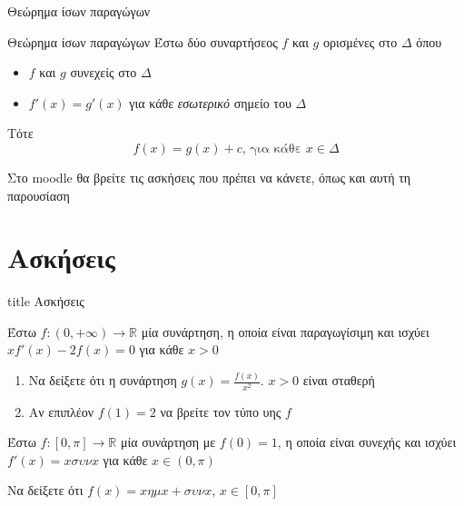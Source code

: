 \documentclass{presentation}
\begin{document}
\begin{frame}{Θεώρημα ίσων παραγώγων}
    \begin{block}{Θεώρημα ίσων παραγώγων}
        Έστω δύο συναρτήσεος $f$ και $g$ ορισμένες στο $Δ$ όπου
        \begin{itemize}
            \item $f$ και $g$ συνεχείς στο $Δ$
            \item $f'(x)=g'(x)$ για κάθε \emph{εσωτερικό} σημείο του $Δ$
        \end{itemize}
        Τότε
        $$f(x)=g(x)+c \text{, για κάθε } x\in Δ$$
    \end{block}
\end{frame}

\begin{frame}
    Στο moodle θα βρείτε τις ασκήσεις που πρέπει να κάνετε, όπως και αυτή τη παρουσίαση
\end{frame}

\section{Ασκήσεις}

\begin{frame}[noframenumbering]
    \vfill
    \centering
    \begin{beamercolorbox}[sep=8pt,center,shadow=true,rounded=true]{title}
        Ασκήσεις
    \end{beamercolorbox}
    \vfill
\end{frame}

\begin{askisi}
    Έστω $f:(0,+\infty)\to\mathbb{R}$ μία συνάρτηση, η οποία είναι παραγωγίσιμη και ισχύει $xf'(x)-2f(x)=0$ για κάθε $x>0$
    \begin{enumerate}
        \item<1-> Να δείξετε ότι η συνάρτηση $g(x)=\frac{f(x)}{x^2}$. $x>0$ είναι σταθερή
        \item<2-> Αν επιπλέον $f(1)=2$ να βρείτε τον τύπο υης $f$
    \end{enumerate}

\end{askisi}

\begin{askisi}
    Έστω $f:[0,π]\to\mathbb{R}$ μία συνάρτηση με $f(0)=1$, η οποία είναι συνεχής και ισχύει $f'(x)=xσυνx$ για κάθε $x\in (0,π)$

    Να δείξετε ότι $f(x)=xημx+συνx$, $x\in [0,π]$

\end{askisi}
\end{document}
